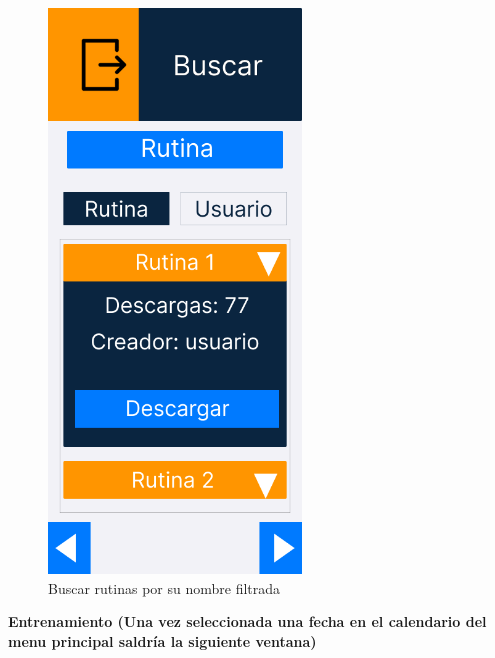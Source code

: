 \begin{figure}[H]
   \centering
    \includegraphics[width=0.6\textwidth]{fotos/Frame 59.png}
    \caption{Buscar rutinas por su nombre filtrada}
    \label{fig:Buscar rutinas por su nombre filtrada}
\end{figure}

\textbf{Entrenamiento (Una vez seleccionada una fecha en el calendario del menu principal saldría la siguiente ventana)}

